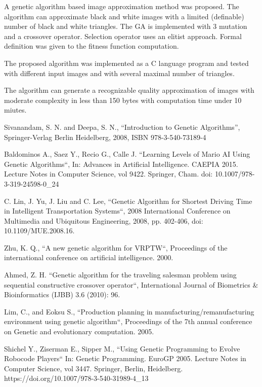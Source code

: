\documentclass[conference]{IEEEtran}
\begin{document}
A genetic algorithm based image approximation method
was proposed. The algorithm can approximate black and
white images with a limited (definable) number of
black and white triangles. The GA is implemented
with 3 mutation and a crossover operator. Selection
operator uses an elitist approach. Formal definition
was given to the fitness function computation.

The proposed algorithm was implemented as a C
language program and tested with different input
images and with several maximal number of triangles.

The algorithm can generate a recognizable quality
approximation of images with moderate complexity
in less than 150 bytes with computation time
under 10 miutes.

\begin{thebibliography}{00}

Sivanandam, S. N. and Deepa, S. N., ``Introduction to Genetic Algorithms'',
	Springer-Verlag Berlin Heidelberg, 2008, ISBN 978-3-540-73189-4

\vfill\eject

Baldominos A., Saez Y., Recio G., Calle J. ``Learning Levels of Mario AI Using Genetic Algorithms``,
	In: Advances in Artificial Intelligence. CAEPIA 2015. Lecture Notes in Computer Science, vol 9422. Springer, Cham. doi: 10.1007/978-3-319-24598-0\_24

C. Lin, J. Yu, J. Liu and C. Lee, ``Genetic Algorithm for Shortest Driving Time in Intelligent Transportation Systems``, 2008 International Conference on Multimedia and Ubiquitous Engineering, 2008, pp. 402-406, doi: 10.1109/MUE.2008.16.

Zhu, K. Q., ``A new genetic algorithm for VRPTW``, Proceedings of the international conference on artificial intelligence. 2000.

Ahmed, Z. H. ``Genetic algorithm for the traveling salesman problem using sequential constructive crossover operator``, International Journal of Biometrics \& Bioinformatics (IJBB) 3.6 (2010): 96.

Lim, C., and Eoksu S., ``Production planning in manufacturing/remanufacturing environment using genetic algorithm``, Proceedings of the 7th annual conference on Genetic and evolutionary computation. 2005.

Shichel Y., Ziserman E., Sipper M., ``Using Genetic Programming to Evolve Robocode Players`` In: Genetic Programming. EuroGP 2005. Lecture Notes in Computer Science, vol 3447. Springer, Berlin, Heidelberg. https://doi.org/10.1007/978-3-540-31989-4\_13


\end{thebibliography}
\end{document}
